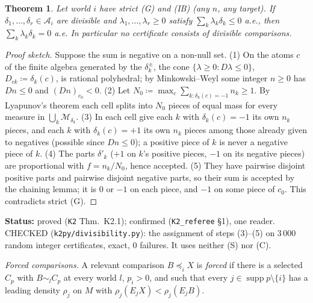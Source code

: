 \documentclass[11pt]{article}
\newtheorem{theorem}{Theorem}[section]
\theoremstyle{definition}
\theoremstyle{remark}
\newcommand{\supp}{\operatorname{supp}}
\newcommand{\src}[1]{\texttt{#1}}
\newcommand{\status}[1]{\par\smallskip\noindent\textbf{Status:} #1\par\smallskip}
\begin{document}
\begin{theorem}\label{thm:K21}
Let world $i$ have strict (G) and (IB) (any $n$, any target). If $\delta_1,\dots,\delta_r\in\mathcal A_i$ are divisible and $\lambda_1,\dots,\lambda_r\ge0$ satisfy $\sum_k\lambda_k\delta_k\le0$ a.e., then $\sum_k\lambda_k\delta_k=0$ a.e. In particular no certificate consists of divisible comparisons.
\end{theorem}
\begin{proof}[Proof sketch]
Suppose the sum is negative on a non-null set. (1) On the atoms $c$ of the finite algebra generated by the $\delta_k^\pm$, the cone $\{\lambda\ge0:D\lambda\le0\}$, $D_{ck}\coloneqq\delta_k(c)$, is rational polyhedral; by Minkowski--Weyl some integer $n\ge0$ has $Dn\le0$ and $(Dn)_{c_0}<0$. (2) Let $N_0\coloneqq\max_c\sum_{k:\delta_k(c)=-1}n_k\ge1$. By Lyapunov's theorem each cell splits into $N_0$ pieces of equal mass for every measure in $\bigcup_k\mathcal M_{\delta_k}$. (3) In each cell give each $k$ with $\delta_k(c)=-1$ its own $n_k$ pieces, and each $k$ with $\delta_k(c)=+1$ its own $n_k$ pieces among those already given to negatives (possible since $Dn\le0$); a positive piece of $k$ is never a negative piece of $k$. (4) The parts $\delta'_k$ ($+1$ on $k$'s positive pieces, $-1$ on its negative pieces) are proportional with $f=n_k/N_0$, hence accepted. (5) They have pairwise disjoint positive parts and pairwise disjoint negative parts, so their sum is accepted by the chaining lemma; it is $0$ or $-1$ on each piece, and $-1$ on some piece of $c_0$. This contradicts strict (G).
\end{proof}
\status{proved (\src{K2} Thm.~K2.1); confirmed (\src{K2\_referee} \S1), one reader. CHECKED (\src{k2py/divisibility.py}): the assignment of steps (3)--(5) on $3\,000$ random integer certificates, exact, 0 failures. It uses neither (S) nor (C).}

\emph{Forced comparisons.} A relevant comparison $B\preceq_iX$ is \emph{forced} if there is a selected $C_p$ with $B\sim_lC_p$ at every world $l$, $p_i>0$, and such that every $j\in\supp p\setminus\{i\}$ has a leading density $\rho_j$ on $M$ with $\rho_j(E_jX)<\rho_j(E_jB)$.
\end{document}

